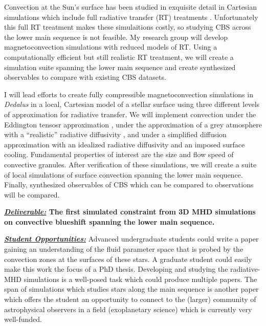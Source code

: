 \documentclass[12pt]{article}
\begin{document}
Convection at the Sun's surface has been studied in exquisite detail in Cartesian simulations which include full radiative transfer (RT) treatments \citep[e.g.,][]{rempel2020, danilovic_etal_2022}.
Unfortunately this full RT treatment makes these simulaitions costly, so studying CBS across the lower main sequence is not feasible.
My research group will develop magnetoconvection simulations with reduced models of RT.
Using a computationally efficient but still realistic RT treatment, we will create a simulation suite spanning the lower main sequence and create synthesized observables to compare with existing CBS datasets.

I will lead efforts to create fully compressible magnetoconvection simulations in \emph{Dedalus} in a local, Cartesian model of a stellar surface using three different levels of approximation for radiative transfer.
We will implement convection under the Eddington tensosr approximation \citep[previously tested in \emph{Dedalus} in ref.][sct.~XI.G]{burns_etal_2020}, under the approximation of a grey atmosphere with a ``realistic'' radiative diffusivity \citep{barekat_brandenburg_2014}, and under a simplified diffusion approximation with an idealized radiative diffusivity and an imposed surface cooling.
Fundamental properties of interest are the size and flow speed of convective granules.
After verification of these simulations, we will create a suite of local simulations of surface convection spanning the lower main sequence.
Finally, synthesized observables of CBS which can be compared to observations \citep{liebing_etal_2021} will be compared.

\textbf{\underline{\emph{Deliverable:}} The first simulated constraint from 3D MHD simulations on convective blueshift spanning the lower main sequence.}

\textbf{\underline{\emph{Student Opportunities:}}} Advanced undergraduate students could write a paper gaining an understanding of the fluid parameter space that is probed by the convection zones at the surfaces of these stars.
A graduate student could easily make this work the focus of a PhD thesis.
Developing and studying the radiative-MHD simulations is a well-posed task which could produce multiple papers.
The span of simulations which studies stars along the main sequence is another paper which offers the student an opportunity to connect to the (larger) community of astrophysical observers in a field (exoplanetary science) which is currently very well-funded.
\end{document}
